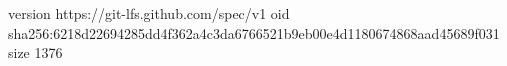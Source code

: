 version https://git-lfs.github.com/spec/v1
oid sha256:6218d22694285dd4f362a4c3da6766521b9eb00e4d1180674868aad45689f031
size 1376
